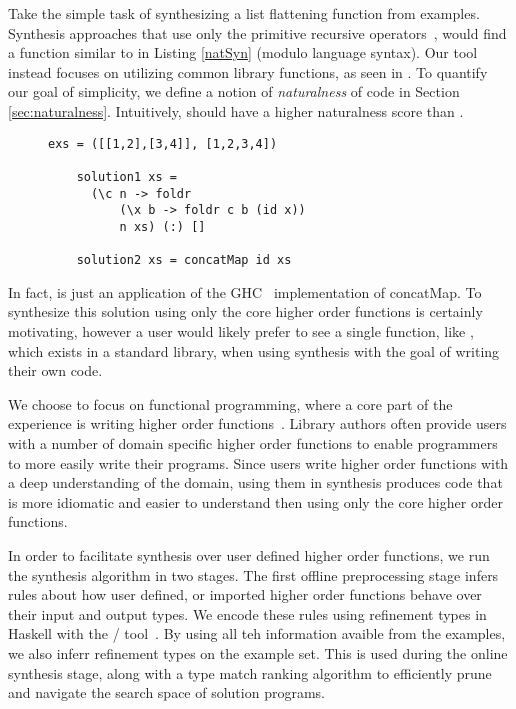 Take the simple task of synthesizing a list flattening function from examples.
Synthesis approaches that use only the primitive recursive operators~\cite{Osera:2015,FeserCD15}, would find a function similar to  in Listing \ref{natSyn} (modulo language syntax).
Our tool instead focuses on utilizing common library functions, as seen in .
To quantify our goal of simplicity, we define a notion of \textit{naturalness} of code in Section \ref{sec:naturalness}.
Intuitively,  should have a higher naturalness score than .


\begin{figure}
  \begin{lstlisting}[caption=Low-level synthesis vs. Natural synthesis,label=natSyn]
    exs = ([[1,2],[3,4]], [1,2,3,4])

    solution1 xs =
      (\c n -> foldr
          (\x b -> foldr c b (id x))
          n xs) (:) []

    solution2 xs = concatMap id xs
    \end{lstlisting}
\end{figure}

\noindent In fact,  is just an application of the GHC~\cite{ghc} implementation of concatMap.
To synthesize this solution using only the core higher order functions is certainly motivating, however a user would likely prefer to see a single function, like , which exists in a standard library, when using synthesis with the goal of writing their own code.

We choose to focus on functional programming, where a core part of the experience is writing higher order functions~\cite{Lipovaca:2011}.
Library authors often provide users with a number of domain specific higher order functions to enable programmers to more easily write their programs.
Since users write higher order functions with a deep understanding of the domain, using them in synthesis produces code that is more idiomatic and easier to understand then using only the core higher order functions.

In order to facilitate synthesis over user defined higher order functions, we run the synthesis algorithm in two stages.
The first offline preprocessing stage infers rules about how user defined, or imported higher order functions behave over their input and output types.
We encode these rules using refinement types in Haskell with the \lhask/ tool~\cite{DBLP:conf/haskell/VazouSJ14}.
By using all teh information avaible from the examples, we also inferr refinement types on the example set. 
This is used during the online synthesis stage, along with a type match ranking algorithm to efficiently prune and navigate the search space of solution programs.


